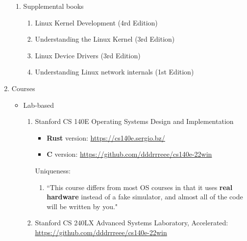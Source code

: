 \documentclass{article}
\begin{document}
\begin{enumerate}
\begin{enumerate}
        \item Supplemental books
        \begin{enumerate}
            \item Linux Kernel Development (4rd Edition) \cite{robert2018linux}
            \item Understanding the Linux Kernel (3rd Edition) \cite{bovet2005understanding}
            \item Linux Device Drivers (3rd Edition) \cite{rubini2001linux}
            \item Understanding Linux network internals (1st Edition) \cite{benvenuti2006understanding}
        \end{enumerate}

    \end{enumerate}
    
    \item Courses
    \begin{itemize}
        \item Lab-based
        \begin{enumerate}
            \item Stanford CS 140E Operating Systems Design and Implementation
            \begin{itemize}
                \item \textbf{Rust} version:
                \href{https://cs140e.sergio.bz/}{https://cs140e.sergio.bz/}
                \item \textbf{C} version:
                \href{https://github.com/dddrrreee/cs140e-22win}{https://github.com/dddrrreee/cs140e-22win}
            \end{itemize}
            Uniqueness:
            \begin{enumerate}
                \item ``This course differs from most OS courses in that it uses \textbf{real hardware} instead of a fake simulator, and almost all of the code will be written by you."
            \end{enumerate}        
            \item Stanford CS 240LX Advanced Systems Laboratory, Accelerated:\\
            \href{https://github.com/dddrrreee/cs140e-22win}{https://github.com/dddrrreee/cs140e-22win}
            

\end{enumerate}
\end{itemize}
\end{enumerate}
\end{document}
